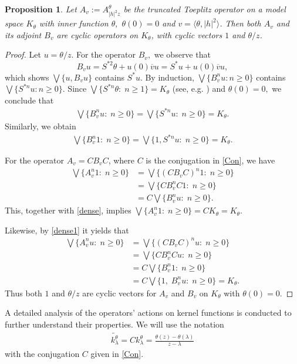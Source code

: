\documentclass[12pt,reqno]{amsart}
\newtheorem{prop}[thm]{Proposition}
\theoremstyle{definition}
\theoremstyle{remark}
\numberwithin{equation}{section}
\newcommand{\la}{\langle}
\newcommand{\ra}{\rangle}
\newcommand{\ol}{\overline}
\begin{document}
 \begin{prop}\label{cyclic} Let $A_v:=A_{|h|^2z}^\theta$ be the truncated Toeplitz operator on
 a model space $K_\theta$ with inner function $\theta,$ $\theta(0)=0$ and $v=\la \theta, |h|^2\ra$. Then both $A_v$ and its adjoint $B_v$ are cyclic operators on $K_\theta$,  with cyclic vectors $1$ and $\theta/z$.  \end{prop}
 \begin{proof}
Let $u=\theta/z$. For the operator $B_v,$ we observe that $$B_v u=S^{*2}\theta+u(0)\ol{v}u=S^{*}u+u(0)\ol{v}u,$$ which shows  $\bigvee\{u, B_v u\}$ contains $S^*u$.  By induction, $\bigvee\{B_v^n u: n\geq0\}$ contains $\bigvee\{S^{*n}u:  n\geq0\}$.  Since  $\bigvee\{S^{*n} \theta :\;n\geq 1\}=K_\theta$ (see, e.g. \cite[Proposition 5.15]{GMR}) and $\theta(0)=0,$ we conclude that \begin{align}\bigvee\{B_v^n u:\;n\geq 0 \}=\bigvee\{S^{*n} u :\;n\geq 0\}=K_\theta.\label{dense}\end{align}Similarly, we obtain
\begin{align}\bigvee\{B_v^n 1:\;n\geq 0 \}=\bigvee\{1, S^{*n} u :\;n\geq 0\}=K_\theta.\label{dense1}\end{align}

For the operator $A_v=CB_vC$, where $C$ is the conjugation in \eqref{Con}, we have
 \begin{align*} \bigvee\{A_v^n1:\; n\geq 0\}&=\bigvee\{(CB_vC)^n1:\;n\geq 0 \}\nonumber \\&= \bigvee\{ CB_v^nC1:\;n\geq 0 \}\nonumber\\&=C\bigvee\{B_v^n u:\;n\geq 0 \}. \end{align*}
 This, together with \eqref{dense}, implies $\bigvee\{A_v^n1:\; n\geq 0\}=CK_\theta=K_\theta.$

Likewise, by \eqref{dense1} it yields that
 \begin{align*} \bigvee\{A_v^n u:\; n\geq 0\}&=\bigvee\{(CB_vC)^nu:\;n\geq 0 \}\nonumber \\&= \bigvee\{ CB_v^nCu:\;n\geq 0 \}\nonumber\\&=C\bigvee\{B_v^n 1:\;n\geq 0 \} \\&=C \bigvee\{1,\;B_v^n u:\;n\geq 0 \}=K_\theta.\end{align*} Thus both $1$ and $\theta/z$ are cyclic vectors for $A_v$ and $B_v$ on $K_\theta$ with $\theta(0)=0.$
\end{proof}

A detailed analysis of the operators' actions on kernel functions is conducted to further understand their properties. We will use the notation \begin{align}\widetilde{k_{\lambda}^\theta}=Ck_{\lambda}^\theta=\frac{\theta(z)-\theta(\lambda)}
{z-\lambda}\label{tilde}\end{align} with  the conjugation $C$ given in \eqref{Con}.
\end{document}
